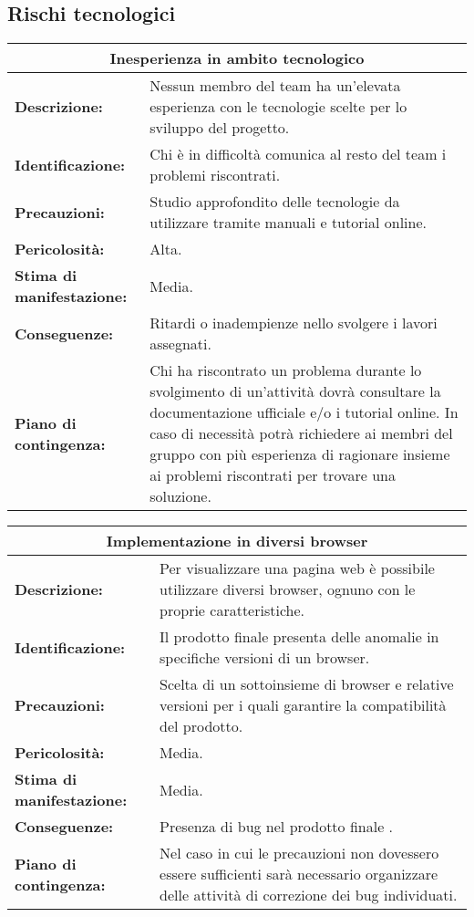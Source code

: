 \subsection{Rischi tecnologici}

\renewcommand\tabularxcolumn[1]{>{\Centering}m{#1}}
\begin{tabularx}{\textwidth}{|X|X|}
\hline
\multicolumn{2}{|c|}{\textbf{Inesperienza in ambito tecnologico}} \\
\hline
\textbf{Descrizione:}& Nessun membro del team ha un'elevata esperienza con le tecnologie scelte per lo sviluppo del progetto.\\
\hline
\textbf{Identificazione:}& Chi è in difficoltà comunica al resto del team i problemi riscontrati.\\
\hline
\textbf{Precauzioni:}& Studio approfondito delle tecnologie da utilizzare tramite manuali e tutorial online.\\
\hline
\textbf{Pericolosità:}& Alta.\\
\hline
\textbf{Stima di manifestazione:}& Media.\\
\hline
\textbf{Conseguenze:}& Ritardi o inadempienze nello svolgere i lavori assegnati.\\
\hline
\textbf{Piano di contingenza:}& Chi ha riscontrato un problema durante lo svolgimento di un'attività dovrà consultare la documentazione ufficiale e/o i tutorial online. In caso di necessità potrà richiedere ai membri del gruppo con più esperienza di ragionare insieme ai problemi riscontrati per trovare una soluzione.\\
\hline
\end{tabularx}

\vspace{20pt}

\begin{tabularx}{\textwidth}{|X|X|}
\hline
\multicolumn{2}{|c|}{\textbf{Implementazione in diversi browser}} \\
\hline
\textbf{Descrizione:}& Per visualizzare una pagina web è possibile utilizzare diversi browser, ognuno con le proprie caratteristiche.\\
\hline
\textbf{Identificazione:}& Il prodotto finale presenta delle anomalie in specifiche versioni di un browser. \\
\hline
\textbf{Precauzioni:}& Scelta di un sottoinsieme di browser e relative versioni per i quali garantire la compatibilità del prodotto. \\
\hline
\textbf{Pericolosità:}& Media.\\
\hline
\textbf{Stima di manifestazione:}& Media.\\
\hline
\textbf{Conseguenze:}& Presenza di bug nel prodotto finale .\\
\hline
\textbf{Piano di contingenza:}& Nel caso in cui le precauzioni non dovessero essere sufficienti sarà necessario organizzare delle attività di correzione dei bug individuati. \\
\hline
\end{tabularx}


